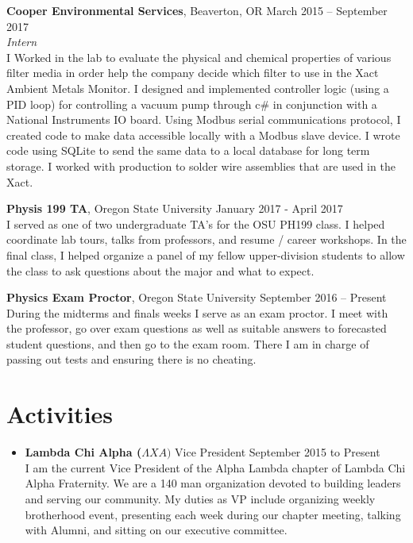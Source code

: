 \documentclass[margin,line]{res}
\begin{document}
\begin{resume}
{\bf Cooper Environmental Services}, Beaverton, OR \hfill{March 2015 -- September 2017}\\
{\em Intern} \\
I Worked in the lab to evaluate the physical and chemical properties of various filter media in order help the company decide which filter to use in the Xact Ambient Metals Monitor. I designed and implemented controller logic (using a PID loop) for controlling a vacuum pump through c\# in conjunction with a National Instruments IO board. Using Modbus serial communications protocol, I created code to make data accessible locally with a Modbus slave device. I wrote code using SQLite to send the same data to a local database for long term storage. I worked with production to solder wire assemblies that are used in the Xact. 

{\bf Physis 199 TA}, Oregon State University \hfill{January 2017 - April 2017} \\
I served as one of two undergraduate TA's for the OSU PH199 class. I helped coordinate lab tours, talks from professors, and resume / career workshops. In the final class, I helped organize a panel of my fellow upper-division students to allow the class to ask questions about the major and what to expect. 


{\bf Physics Exam Proctor}, Oregon State University \hfill{September 2016 -- Present}\\
During the midterms and finals weeks I serve as an exam proctor. I meet with the professor, go over exam questions as well as suitable answers to forecasted student questions, and then go to the exam room. There I am in charge of passing out tests and ensuring there is no cheating. 

\section{\sc Activities}
\begin{itemize} 
	\item {\bf Lambda Chi Alpha ($\Lambda XA)$} Vice President \hfill September 2015 to Present\\
	I am the current Vice President of the Alpha Lambda chapter of Lambda Chi Alpha Fraternity. We are a 140 man organization devoted to building leaders and serving our community. My duties as VP include organizing weekly brotherhood event, presenting each week during our chapter meeting, talking with Alumni, and sitting on our executive committee. 
	

\end{itemize}
\end{resume}
\end{document}
